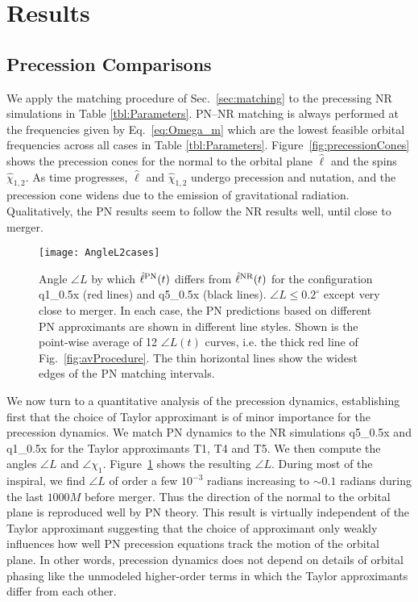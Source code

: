 \documentclass[aps,prd,amsmath,floatfix,twocolumn,superscriptaddress,nofootinbib,showpacs]{revtex4-1}
\newcommand{\ellHat}{\ensuremath{\hat{\ell}}}
\begin{document}
\section{Results}
\label{sec:comparison}

\subsection{Precession Comparisons}
\label{sec:PrecessionComparisons}

We apply the matching procedure of Sec.~\ref{sec:matching} to the
precessing NR simulations in Table \ref{tbl:Parameters}. PN--NR
matching is always performed at the frequencies given by
Eq.~\eqref{eq:Omega_m} which are the lowest feasible orbital
frequencies across all cases in Table \ref{tbl:Parameters}.
Figure~\ref{fig:precessionCones} shows the precession cones for the
normal to the orbital plane $\ellHat$ and the spins
$\hat{\chi}_{1,2}$.   As
time progresses, $\ellHat$ and $\hat{\chi}_{1,2}$ undergo precession
and nutation, and the precession cone widens due to the emission of
gravitational radiation. Qualitatively, the PN results seem to follow
the NR results well, until close to merger.


\begin{figure}
  \texttt{[image: AngleL2cases]}
  \caption{\label{fig:2casesLAngles}
    Angle $\angle L$ by which $\ellHat^{\rm PN}(t)$ differs from
    $\ellHat^{\rm NR}(t)$ for the configuration q1\_0.5x (red lines) and
    q5\_0.5x (black lines). $\angle L \le 0.2^{\circ}$ except very
    close to merger. In each case, the PN predictions based on
    different PN approximants are shown in different line styles. 
    Shown is the point-wise average of 12 $\angle L(t)$ curves, i.e. the
    thick red line of Fig.~\ref{fig:avProcedure}. The thin horizontal
    lines show the widest edges of the PN matching intervals.}
\end{figure}

 
We now turn to a quantitative analysis of the precession dynamics,
establishing first that the choice of Taylor approximant is of minor
importance for the precession dynamics.  We match PN dynamics to the
NR simulations q5\_0.5x and q1\_0.5x for the Taylor approximants T1,
T4 and T5.  We then compute the angles $\angle L$ and $\angle
\chi_{1}$.  Figure~\ref{fig:2casesLAngles} shows the resulting $\angle
L$.  During most of the inspiral, we find $\angle L$ of order a few
$10^{-3}$ radians increasing to $\sim 0.1$ radians during the last
$1000M$ before merger.  Thus the direction of the normal to the
orbital plane is reproduced well by PN theory. This result is
virtually independent of the Taylor approximant suggesting that the
choice of approximant only weakly influences how well PN precession
equations track the motion of the orbital plane.  In other words,
precession dynamics does not depend on details of orbital phasing like
the unmodeled higher-order terms in which the Taylor approximants
differ from each other.
\end{document}
